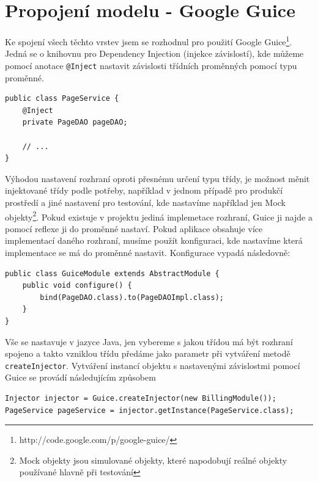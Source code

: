 \section{Propojení modelu - Google Guice}
Ke spojení všech těchto vrstev jsem se rozhodnul pro použití Google Guice\footnote{ http://code.google.com/p/google-guice/}. Jedná se o knihovnu pro Dependency Injection (injekce závislostí), kde můžeme pomocí anotace \verb|@Inject| nastavit závislosti třídních proměnných pomocí typu proměnné.

\begin{lstlisting}[caption={Ukázka použití Google Guice za pomocí anotace @Inject},label=lst:guiceInject,belowcaptionskip=0.4cm]
public class PageService {
	@Inject
	private PageDAO pageDAO;

	// ...
}
\end{lstlisting}

Výhodou nastavení rozhraní oproti přesnému určení typu třídy, je možnost měnit injektované třídy podle potřeby, například v jednom případě pro produkčí prostředí a jiné nastavení pro testování, kde nastavíme například jen Mock objekty\footnote{Mock objekty jsou simulované objekty, které napodobují reálné objekty používané hlavně při testování}. Pokud existuje v projektu jediná implemetace rozhraní, Guice ji najde a pomocí reflexe ji do proměnné nastaví. Pokud aplikace obsahuje více implementací daného rozhraní, musíme použít konfiguraci, kde nastavíme která implementace se má do proměnné nastavit. Konfigurace vypadá následovně:

\begin{lstlisting}[caption={Příklad konfigurace Google Guice},label=lst:guiceConfiguration,belowcaptionskip=0.4cm]
public class GuiceModule extends AbstractModule {
	public void configure() {
		bind(PageDAO.class).to(PageDAOImpl.class);
	}
}
\end{lstlisting}

Vše se nastavuje v jazyce Java, jen vybereme s jakou třídou má být rozhraní spojeno a takto vzniklou třídu předáme jako parametr při vytváření metodě \verb|createInjector|. Vytváření instancí objektu s nastavenými závislostmi pomocí Guice se provádí následujícím způsobem

\begin{lstlisting}[caption={Získávání sestavených tříd pomocí Google Guice},label=lst:guiceGetClass,belowcaptionskip=0.4cm]
Injector injector = Guice.createInjector(new BillingModule());
PageService pageService = injector.getInstance(PageService.class);
\end{lstlisting}

